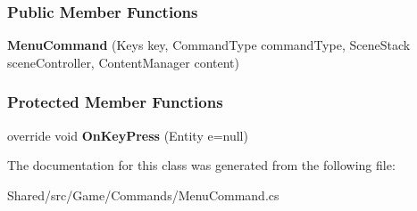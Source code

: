 \subsubsection*{Public Member Functions}
\begin{DoxyCompactItemize}
\item 
\hypertarget{class_midnight_blue_1_1_menu_command_ac494139f6aafe9e9d1f24b3cce518279}{}\label{class_midnight_blue_1_1_menu_command_ac494139f6aafe9e9d1f24b3cce518279} 
{\bfseries Menu\+Command} (Keys key, Command\+Type command\+Type, Scene\+Stack scene\+Controller, Content\+Manager content)
\end{DoxyCompactItemize}
\subsubsection*{Protected Member Functions}
\begin{DoxyCompactItemize}
\item 
\hypertarget{class_midnight_blue_1_1_menu_command_a2101f922aa12bd7fed4eff3eb714a9d4}{}\label{class_midnight_blue_1_1_menu_command_a2101f922aa12bd7fed4eff3eb714a9d4} 
override void {\bfseries On\+Key\+Press} (Entity e=null)
\end{DoxyCompactItemize}


The documentation for this class was generated from the following file\+:\begin{DoxyCompactItemize}
\item 
Shared/src/\+Game/\+Commands/Menu\+Command.\+cs\end{DoxyCompactItemize}
